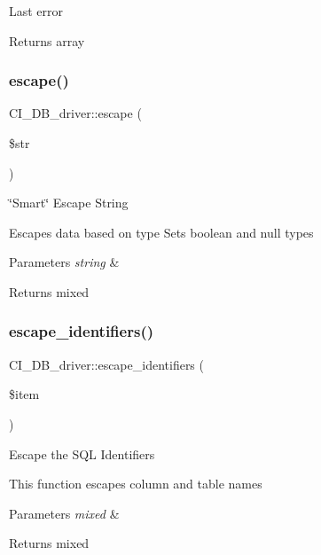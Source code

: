 Last error

\begin{DoxyReturn}{Returns}
array 
\end{DoxyReturn}
\mbox{\label{class_c_i___d_b__driver_a75beb60cdd3ee1875646d729963f5f5f}} 
\subsubsection{\texorpdfstring{escape()}{escape()}}
{\footnotesize\ttfamily C\+I\+\_\+\+D\+B\+\_\+driver\+::escape (\begin{DoxyParamCaption}\item[{}]{\$str }\end{DoxyParamCaption})}

\char`\"{}\+Smart\char`\"{} Escape String

Escapes data based on type Sets boolean and null types


\begin{DoxyParams}{Parameters}
{\em string} & \\
\hline
\end{DoxyParams}
\begin{DoxyReturn}{Returns}
mixed 
\end{DoxyReturn}
\mbox{\label{class_c_i___d_b__driver_a0d40bc79643516205ebc37d04f41cc4b}} 
\subsubsection{\texorpdfstring{escape\+\_\+identifiers()}{escape\_identifiers()}}
{\footnotesize\ttfamily C\+I\+\_\+\+D\+B\+\_\+driver\+::escape\+\_\+identifiers (\begin{DoxyParamCaption}\item[{}]{\$item }\end{DoxyParamCaption})}

Escape the S\+QL Identifiers

This function escapes column and table names


\begin{DoxyParams}{Parameters}
{\em mixed} & \\
\hline
\end{DoxyParams}
\begin{DoxyReturn}{Returns}
mixed 
\end{DoxyReturn}
\mbox{\label{class_c_i___d_b__driver_a9a9890fe00e29e5664ce2df0eb00b060}} 
